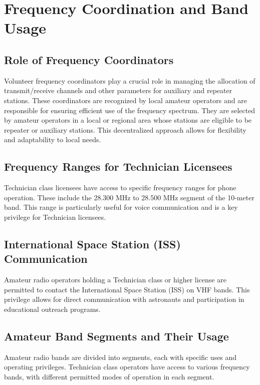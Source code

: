 \section{Frequency Coordination and Band Usage}
\label{sec:frequency_coordination}

\subsection*{Role of Frequency Coordinators}
Volunteer frequency coordinators play a crucial role in managing the allocation of transmit/receive channels and other parameters for auxiliary and repeater stations. These coordinators are recognized by local amateur operators and are responsible for ensuring efficient use of the frequency spectrum. They are selected by amateur operators in a local or regional area whose stations are eligible to be repeater or auxiliary stations. This decentralized approach allows for flexibility and adaptability to local needs.

\subsection*{Frequency Ranges for Technician Licensees}
Technician class licensees have access to specific frequency ranges for phone operation. These include the 28.300 MHz to 28.500 MHz segment of the 10-meter band. This range is particularly useful for voice communication and is a key privilege for Technician licensees.

\subsection*{International Space Station (ISS) Communication}
Amateur radio operators holding a Technician class or higher license are permitted to contact the International Space Station (ISS) on VHF bands. This privilege allows for direct communication with astronauts and participation in educational outreach programs.

\subsection*{Amateur Band Segments and Their Usage}
Amateur radio bands are divided into segments, each with specific uses and operating privileges. Technician class operators have access to various frequency bands, with different permitted modes of operation in each segment.

